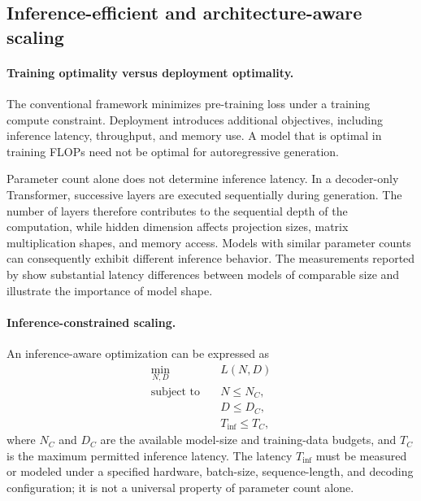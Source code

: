 \subsection{Inference-efficient and architecture-aware scaling}
\label{subsec:scaling-inference-architecture}

\paragraph{Training optimality versus deployment optimality.}
The conventional framework minimizes pre-training loss under a training
compute constraint. Deployment introduces additional objectives, including
inference latency, throughput, and memory use. A model that is optimal in
training FLOPs need not be optimal for autoregressive generation.

Parameter count alone does not determine inference latency. In a
decoder-only Transformer, successive layers are executed sequentially during
generation. The number of layers therefore contributes to the sequential
depth of the computation, while hidden dimension affects projection sizes,
matrix multiplication shapes, and memory access. Models with similar
parameter counts can consequently exhibit different inference behavior.
The measurements reported by \textcite{Bian2025InferenceEfficient} show
substantial latency differences between models of comparable size and
illustrate the importance of model shape.

\paragraph{Inference-constrained scaling.}
An inference-aware optimization can be expressed as
\begin{equation}
    \begin{aligned}
        \min_{N,D}\quad & L(N,D)\\
        \text{subject to}\quad
        &N\leq N_C,\\
        &D\leq D_C,\\
        &T_{\mathrm{inf}}\leq T_C,
    \end{aligned}
    \label{eq:scaling-inference-constrained}
\end{equation}
where \(N_C\) and \(D_C\) are the available model-size and training-data
budgets, and \(T_C\) is the maximum permitted inference latency. The
latency \(T_{\mathrm{inf}}\) must be measured or modeled under a specified
hardware, batch-size, sequence-length, and decoding configuration; it is
not a universal property of parameter count alone.

